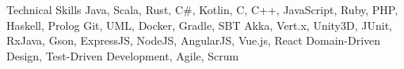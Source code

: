 
\begin{rubric}{Technical Skills}
	Java, Scala, Rust, C\#, Kotlin, C, C++, JavaScript, Ruby, PHP, Haskell, Prolog
	Git, UML, Docker, Gradle, SBT
	Akka, Vert.x, Unity3D, JUnit, RxJava, Gson, ExpressJS, NodeJS, AngularJS, Vue.js, React
	Domain-Driven Design, Test-Driven Development, Agile, Scrum
\end{rubric}
